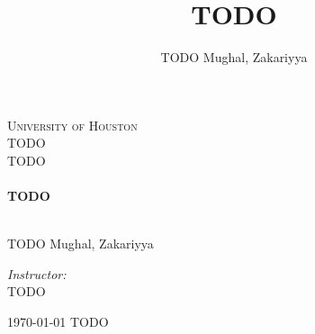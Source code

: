 \documentclass[12pt]{article}
\title{TODO}
\author{%
TODO Mughal, Zakariyya
}
\date{}
\begin{document}
\begin{titlepage}
\begin{center}
\textsc{\LARGE University of Houston} \\[1.5cm]

\textsc{\Large TODO\\%
 TODO} \\[0.5cm]

\HRule \\[0.4cm]
{\huge \bfseries TODO} \\[0.4cm]
\HRule \\[1.5cm]

\begin{flushleft} \large
TODO
Mughal, Zakariyya
\end{flushleft}
\begin{flushright} \large
\emph{Instructor:} \\
TODO
\end{flushright}

\vfill

{\large \today{} TODO}
\end{center}
\end{titlepage}

%

%
%
\end{document}
